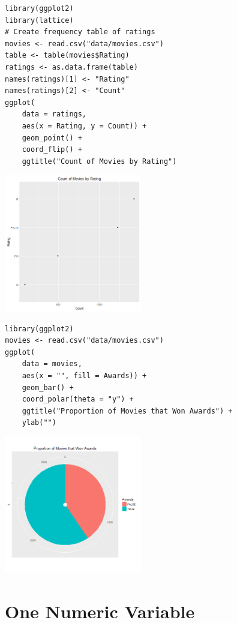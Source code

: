 \documentclass[a4paper, captions=tableheading]{tufte-book}
\begin{document}
\begin{verbatim}
library(ggplot2)
library(lattice)
# Create frequency table of ratings
movies <- read.csv("data/movies.csv")
table <- table(movies$Rating)
ratings <- as.data.frame(table)
names(ratings)[1] <- "Rating"
names(ratings)[2] <- "Count"
ggplot(
	data = ratings,
	aes(x = Rating, y = Count)) +
	geom_point() +
	coord_flip() +
	ggtitle("Count of Movies by Rating")
\end{verbatim}

\includegraphics[height=6cm]{img/1-cat-ggplot2-02.png}

\begin{verbatim}
library(ggplot2)
movies <- read.csv("data/movies.csv")
ggplot(
	data = movies,
	aes(x = "", fill = Awards)) +
	geom_bar() +
	coord_polar(theta = "y") +
	ggtitle("Proportion of Movies that Won Awards") +
	ylab("")
\end{verbatim}

\includegraphics[height=6cm]{img/1-cat-ggplot2-03.png}

\section{One Numeric Variable}
\label{sec:orgheadline10}
\end{document}
